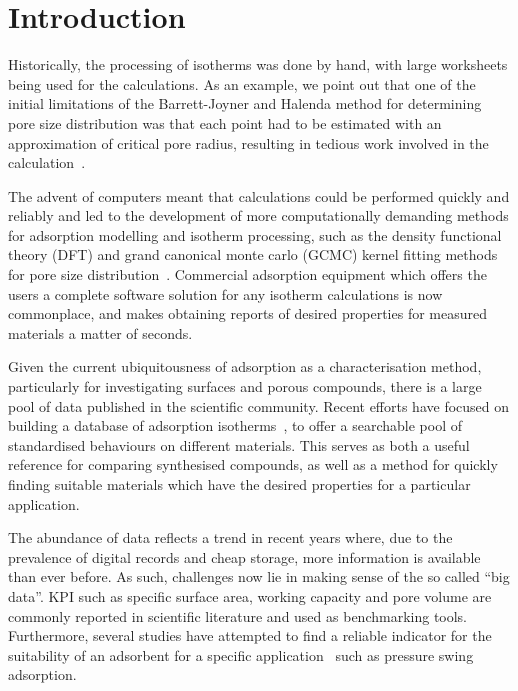 
\section{Introduction}

Historically, the processing of isotherms was done by hand, with large
worksheets being used for the calculations. As an example,
we point out that one of the initial limitations of the
Barrett-Joyner and Halenda method for determining pore size distribution
was that each point had to be estimated with an approximation of critical
pore radius, resulting in tedious work involved in the
calculation~\cite{barrettDeterminationPoreVolume1951}.

The advent of computers meant that calculations could be performed
quickly and reliably and led to the development of more computationally
demanding methods for adsorption modelling and isotherm processing, such as the 
density functional theory (DFT) and grand canonical monte carlo (GCMC) kernel fitting
methods for pore size distribution~\cite{seatonNewAnalysisMethod1989,%
	tarazonaPhaseEquilibriaFluid1987}.
Commercial adsorption equipment which offers the users
a complete software solution for any isotherm calculations is now
commonplace, and makes obtaining reports of desired properties
for measured materials a matter of seconds.

Given the current ubiquitousness of adsorption as a characterisation method,
particularly for investigating surfaces and porous compounds,
there is a large pool of data published in the scientific community.
Recent efforts have focused on building a database of adsorption
isotherms~\cite{sideriusNISTARPAEDatabase2015}, to offer a searchable
pool of standardised behaviours on different materials. This serves as
both a useful reference for comparing synthesised compounds, as well as a
method for quickly finding suitable materials which have the
desired properties for a particular application.

The abundance of data reflects a trend in recent years where, due
to the prevalence of digital records and cheap storage, more
information is available than ever before. As such, challenges
now lie in making sense of the so called ``big data''.
\gls{KPI} such as specific surface area, working
capacity and pore volume are commonly reported in scientific literature
and used as benchmarking tools. Furthermore,
several studies have attempted to find a reliable indicator for
the suitability of an adsorbent for a specific
application~\cite{regeSimpleParameterSelecting2001, %
	ackley2000psa,%
	wiersumAdsorbentPerformanceIndicator2013} such as pressure swing
adsorption.

